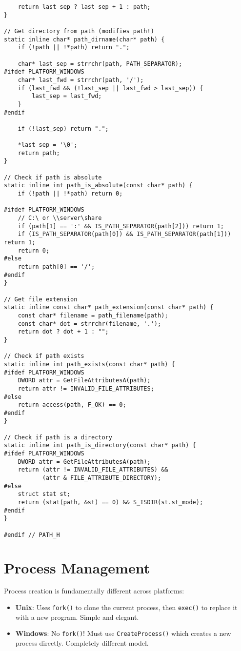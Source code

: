 \begin{lstlisting}
    return last_sep ? last_sep + 1 : path;
}

// Get directory from path (modifies path!)
static inline char* path_dirname(char* path) {
    if (!path || !*path) return ".";

    char* last_sep = strrchr(path, PATH_SEPARATOR);
#ifdef PLATFORM_WINDOWS
    char* last_fwd = strrchr(path, '/');
    if (last_fwd && (!last_sep || last_fwd > last_sep)) {
        last_sep = last_fwd;
    }
#endif

    if (!last_sep) return ".";

    *last_sep = '\0';
    return path;
}

// Check if path is absolute
static inline int path_is_absolute(const char* path) {
    if (!path || !*path) return 0;

#ifdef PLATFORM_WINDOWS
    // C:\ or \\server\share
    if (path[1] == ':' && IS_PATH_SEPARATOR(path[2])) return 1;
    if (IS_PATH_SEPARATOR(path[0]) && IS_PATH_SEPARATOR(path[1])) return 1;
    return 0;
#else
    return path[0] == '/';
#endif
}

// Get file extension
static inline const char* path_extension(const char* path) {
    const char* filename = path_filename(path);
    const char* dot = strrchr(filename, '.');
    return dot ? dot + 1 : "";
}

// Check if path exists
static inline int path_exists(const char* path) {
#ifdef PLATFORM_WINDOWS
    DWORD attr = GetFileAttributesA(path);
    return attr != INVALID_FILE_ATTRIBUTES;
#else
    return access(path, F_OK) == 0;
#endif
}

// Check if path is a directory
static inline int path_is_directory(const char* path) {
#ifdef PLATFORM_WINDOWS
    DWORD attr = GetFileAttributesA(path);
    return (attr != INVALID_FILE_ATTRIBUTES) &&
           (attr & FILE_ATTRIBUTE_DIRECTORY);
#else
    struct stat st;
    return (stat(path, &st) == 0) && S_ISDIR(st.st_mode);
#endif
}

#endif // PATH_H
\end{lstlisting}

\section{Process Management}

Process creation is fundamentally different across platforms:

\begin{itemize}
    \item \textbf{Unix}: Uses \texttt{fork()} to clone the current process, then \texttt{exec()} to replace it with a new program. Simple and elegant.

    \item \textbf{Windows}: No \texttt{fork()}! Must use \texttt{CreateProcess()} which creates a new process directly. Completely different model.
\end{itemize}

